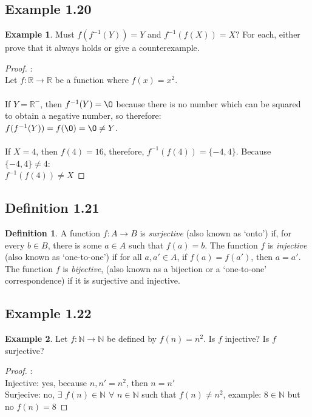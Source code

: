 \documentclass[openany, amssymb, psamsfonts]{amsart}
\renewcommand{\emptyset}{\O}
\theoremstyle{definition}
\newtheorem{defn}{Definition}[section]
\newtheorem{exmp}{Example}[section]
\numberwithin{equation}{section}
\begin{document}
\subsection{Example 1.20}
\begin{exmp}
    Must $f(f^{-1}(Y))=Y$ and $f^{-1}(f(X))=X?$ For each, either prove that it always holds or give a counterexample.
\end{exmp}
\begin{proof}:\\
    Let $f \colon \mathbb R \rightarrow \mathbb R$ be a function where $f(x)=x^2$. \\
\\
If $Y=\mathbb R^{-}$, then $f^{-1}(Y)=\emptyset$ because there is no number which can be squared to obtain a negative number, so therefore:\\
$f(f^{-1}(Y))=f(\emptyset)=\emptyset \neq Y$. \\
\\
If $X = {4}$, then $f(4) = 16$, therefore, $f^{-1}(f(4)) = \{-4,4\}$. Because $\{-4,4\}\neq {4}$:\\
$f^{-1}(f(4)) \neq X$
\end{proof}
\subsection{Definition 1.21}
\begin{defn}
    A function $f \colon A \rightarrow B$ is \emph{surjective} (also known as `onto') if, 
for every $b\in B$, there is some $a\in A$ such that $f(a) = b$.  The function $f$ is \emph{injective} (also known as `one-to-one') if for all $a, a' \in A$, if $f(a) = f(a')$, then $a = a'$.  The function $f$ is \emph{bijective}, (also known as a bijection or a `one-to-one' correspondence) if it is surjective and injective.
\end{defn}
\subsection{Example 1.22}
\begin{exmp}
    Let $f:{\mathbb N}\rightarrow {\mathbb N}$ be defined by $f(n)=n^2$.  Is $f$ injective?  Is $f$ surjective?
\end{exmp}
\begin{proof}:\\
    Injective: yes, because $n,n' = n^2$, then $n=n'$\\
Surjecive: no, $\exists$ $ f(n)\in \mathbb N $ $ \forall $ $ n \in \mathbb N$ such that $f(n) \neq n^2$, example: $8 \in \mathbb N$ but no $f(n) = 8$
\end{proof}
\end{document}
